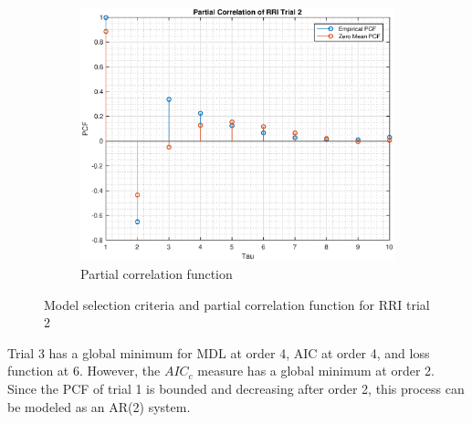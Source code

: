 \documentclass{article}
\begin{document}
\begin{figure}[h!]
\begin{subfigure}{0.32\textwidth}
\centering
\includegraphics[width = \textwidth]{heart_pcf_t2}
\caption{Partial correlation function}
\label{fig:heart_pcf_t1}
\end{subfigure}
\caption{Model selection criteria and partial correlation function for RRI trial 2}
\label{heart_t2}
\end{figure}

Trial 3 has a global minimum for MDL at order 4, AIC at order 4, and loss function at 6. However, the $AIC_c$ measure has a global minimum at order 2. Since the PCF of trial 1 is bounded and decreasing after order 2, this process can be modeled as an AR(2) system.\\
\end{document}
